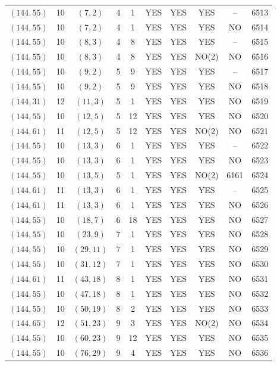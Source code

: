 \begin{longtable}{|c|c|c|c|c|c|c|c|c|c|}
$(144, 55)$ & 10 & $(7, 2)$ & 4 & 1 & YES & YES & YES & -- & 6513\\
$(144, 55)$ & 10 & $(7, 2)$ & 4 & 1 & YES & YES & YES & NO & 6514\\
$(144, 55)$ & 10 & $(8, 3)$ & 4 & 8 & YES & YES & YES & -- & 6515\\
$(144, 55)$ & 10 & $(8, 3)$ & 4 & 8 & YES & YES & NO(2) & NO & 6516\\
$(144, 55)$ & 10 & $(9, 2)$ & 5 & 9 & YES & YES & YES & -- & 6517\\
$(144, 55)$ & 10 & $(9, 2)$ & 5 & 9 & YES & YES & YES & NO & 6518\\
$(144, 31)$ & 12 & $(11, 3)$ & 5 & 1 & YES & YES & YES & NO & 6519\\
$(144, 55)$ & 10 & $(12, 5)$ & 5 & 12 & YES & YES & YES & NO & 6520\\
$(144, 61)$ & 11 & $(12, 5)$ & 5 & 12 & YES & YES & NO(2) & NO & 6521\\
$(144, 55)$ & 10 & $(13, 3)$ & 6 & 1 & YES & YES & YES & -- & 6522\\
$(144, 55)$ & 10 & $(13, 3)$ & 6 & 1 & YES & YES & YES & NO & 6523\\
$(144, 55)$ & 10 & $(13, 5)$ & 5 & 1 & YES & YES & NO(2) & 6161 & 6524\\
$(144, 61)$ & 11 & $(13, 3)$ & 6 & 1 & YES & YES & YES & -- & 6525\\
$(144, 61)$ & 11 & $(13, 3)$ & 6 & 1 & YES & YES & YES & NO & 6526\\
$(144, 55)$ & 10 & $(18, 7)$ & 6 & 18 & YES & YES & YES & NO & 6527\\
$(144, 55)$ & 10 & $(23, 9)$ & 7 & 1 & YES & YES & YES & NO & 6528\\
$(144, 55)$ & 10 & $(29, 11)$ & 7 & 1 & YES & YES & YES & NO & 6529\\
$(144, 55)$ & 10 & $(31, 12)$ & 7 & 1 & YES & YES & YES & NO & 6530\\
$(144, 61)$ & 11 & $(43, 18)$ & 8 & 1 & YES & YES & YES & NO & 6531\\
$(144, 55)$ & 10 & $(47, 18)$ & 8 & 1 & YES & YES & YES & NO & 6532\\
$(144, 55)$ & 10 & $(50, 19)$ & 8 & 2 & YES & YES & YES & NO & 6533\\
$(144, 65)$ & 12 & $(51, 23)$ & 9 & 3 & YES & YES & NO(2) & NO & 6534\\
$(144, 55)$ & 10 & $(60, 23)$ & 9 & 12 & YES & YES & YES & NO & 6535\\
$(144, 55)$ & 10 & $(76, 29)$ & 9 & 4 & YES & YES & YES & NO & 6536\\

\end{longtable}
